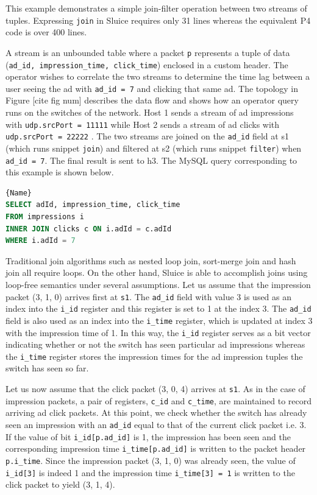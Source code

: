 \documentclass[12pt, oneside]{article}
\begin{document}
This example demonstrates a simple join-filter operation between two streams of
tuples. Expressing \texttt{join} in Sluice requires only 31 lines whereas the equivalent P4 code is over 400 lines. 

A stream is an unbounded table where a packet \texttt{p} represents a tuple of
data (\texttt{ad\_id, impression\_time, click\_time}) enclosed in a custom
header. The operator wishes to correlate the two streams to determine the time lag between a user seeing the ad with \texttt{ad\_id = 7} and clicking that same ad. The topology in Figure [cite fig num] describes the data flow and shows how an
operator query runs on the switches of the network. Host 1 sends a stream of ad
impressions with \texttt{udp.srcPort = 11111} while Host 2 sends a stream of ad clicks with \texttt{udp.srcPort = 22222} . The two streams are
joined on the \texttt{ad\_id} field at s1 (which runs snippet \texttt{join}) and filtered at s2 (which runs snippet \texttt{filter}) when \texttt{ad\_id = 7}. The final result is sent to h3. The MySQL query corresponding to this example is shown below.

\begin{lstlisting}[frame=tlrb, language = SQL, basicstyle=\linespread{1.3}\scriptsize]{Name}
SELECT adId, impression_time, click_time 
FROM impressions i 
INNER JOIN clicks c ON i.adId = c.adId
WHERE i.adId = 7
\end{lstlisting}

Traditional join algorithms such as nested loop join, sort-merge join and hash join all require loops. On the other hand, Sluice is able to accomplish joins using loop-free semantics under several assumptions. Let us assume that the impression packet (3, 1, 0) arrives first at \texttt{s1}. The \texttt{ad\_id} field with value 3 is used as an index into the \texttt{i\_id} register and this register is set to 1 at the index 3. The \texttt{ad\_id} field is also used as an index into the \texttt{i\_time} register, which is updated at index 3 with the impression time of 1. In this way, the \texttt{i\_id} register serves as a bit vector indicating whether or not the switch has seen particular ad impressions whereas the \texttt{i\_time} register stores the impression times for the ad impression tuples the switch has seen so far. 

Let us now assume that the click packet (3, 0, 4) arrives at \texttt{s1}. As in the case of impression packets, a pair of registers, \texttt{c\_id} and \texttt{c\_time}, are maintained to record arriving ad click packets. At this point, we check whether the switch has already seen an impression with an \texttt{ad\_id} equal to that of the current click packet i.e. 3. If the value of bit \texttt{i\_id[p.ad\_id]} is 1, the impression has been seen and the corresponding impression time \texttt{i\_time[p.ad\_id]} is written to the packet header \texttt{p.i\_time}. Since the impression packet (3, 1, 0) was already seen, the value of \texttt{i\_id[3]} is indeed 1 and the impression time \texttt{i\_time[3] = 1} is written to the click packet to yield (3, 1, 4). 
\end{document}
